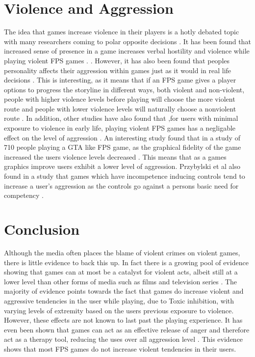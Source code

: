 \documentclass{scrartcl}
\begin{document}
\section{Violence and Aggression}
The idea that games increase violence in their players is a hotly debated topic with many researchers coming to polar opposite decisions \cite {zhang2009violent}. It has been found that increased sense of presence in a game increases verbal hostility and violence while playing violent FPS games \cite{nowak2008causes}. . However, it has also been found that peoples personality affects their aggression within games just as it would in real life decisions \cite{murzyn2016our}. This is interesting, as it means that if an FPS game gives a player options to progress the storyline in different ways, both violent and non-violent, people with higher violence levels before playing will choose the more violent route and people with lower violence levels will naturally choose a nonviolent route \cite{murzyn2016our}. In addition, other studies have also found that ,for users with minimal exposure to violence in early life, playing violent FPS games has a negligable effect on the level of aggression \cite{fumhe2015violent}. An interesting study found that in a study of 710 people playing a GTA like FPS game, as the graphical fidelity of the game increased the users violence levels decreased \cite{zendle2015higher}. This means that as a games graphics improve users exhibit a lower level of aggression. Przybylski et al also found in a study that games which have incompetence inducing controls tend to increase a user's aggression as the controls go against a persons basic need for competency \cite{przybylski2014competence}.


\section{Conclusion}
Although the media often places the blame of violent crimes on violent games, there is little evidence to back this up. In fact there is a growing pool of evidence showing that games can at most be a catalyst for violent acts, albeit still at a lower level than other forms of media such as films and television series \cite{rawn2008examining}. The majority of evidence points towards the fact that games do increase violent and aggressive tendencies in the user while playing, due to Toxic inhibition, with varying levels of extremity based on the users previous exposure to violence. However, these effects are not known to last past the playing experience. It has even been shown that games can act as an effective release of anger and therefore act as a therapy tool, reducing the uses over all aggression level \cite {lee2016role}. This evidence shows that most FPS games do not increase violent tendencies in their users.




\end{document}
